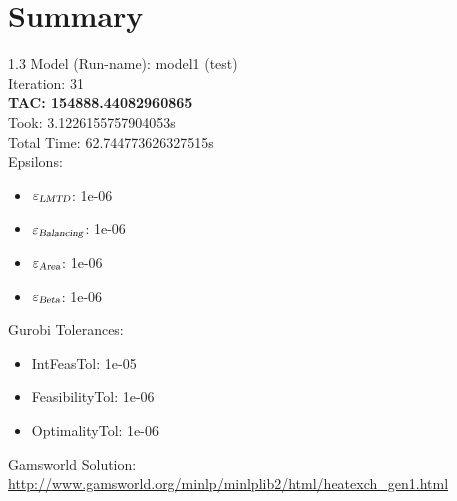 \documentclass{article}%
\begin{document}
%
\normalsize%
\section{Summary}%
\thispagestyle{plain}%
\begin{spacing}{1.3}%
\Large%
Model (Run-name): model1 (test)\\%
Iteration: 31\\%
\textbf{TAC: 154888.44082960865}\\%
Took: 3.1226155757904053s\\%
Total Time: 62.744773626327515s\\%
Epsilons:%
\begin{itemize}%
	\item $\varepsilon_{\textsl{LMTD}}$: 1e-06%
	\item $\varepsilon_{\textsl{Balancing}}$: 1e-06%
	\item $\varepsilon_{\textsl{Area}}$: 1e-06%
	\item $\varepsilon_{\textsl{Beta}}$: 1e-06%
\end{itemize}%
Gurobi Tolerances:%
\begin{itemize}%
	\item IntFeasTol: 1e-05%
	\item FeasibilityTol: 1e-06%
	\item OptimalityTol: 1e-06%
\end{itemize}%
\end{spacing}%
\normalsize%
Gamsworld Solution: \url{http://www.gamsworld.org/minlp/minlplib2/html/heatexch_gen1.html}%
%
\clearpage%
\end{document}
